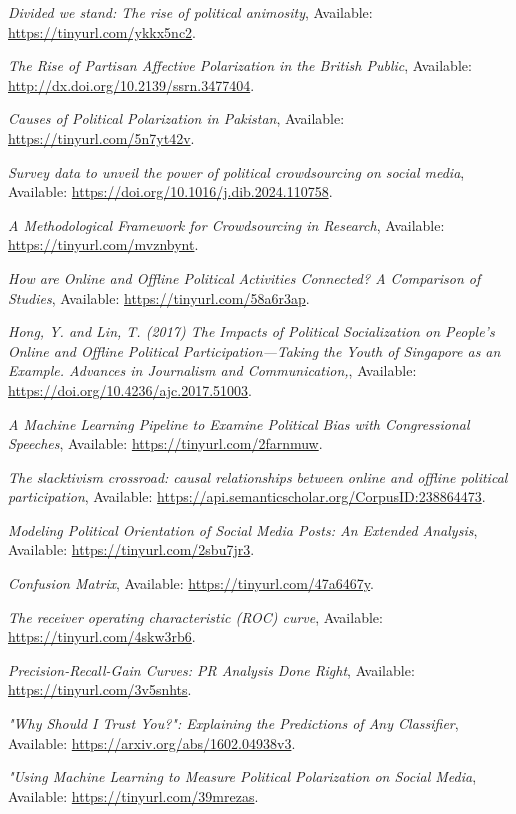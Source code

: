 \documentclass[pt]{article}  %
\begin{document}
\begin{thebibliography}{9}
\small {}\label{ref1}
\textit{Divided we stand: The rise of political animosity},
Available: \url{https://tinyurl.com/ykkx5nc2}.

\small {}\label{ref2}
\textit{The Rise of Partisan Affective Polarization in the British Public},
Available: \url{http://dx.doi.org/10.2139/ssrn.3477404}.

\small
{}\label{ref3}
\textit{Causes of Political Polarization in Pakistan},
Available: \url{https://tinyurl.com/5n7yt42v}. 

\label{ref4}
 \textit{Survey data to unveil the power of political crowdsourcing on social media},
Available: \url{https://doi.org/10.1016/j.dib.2024.110758}.

\label{ref5}
\textit{A Methodological Framework for Crowdsourcing in Research},
Available: \url{https://tinyurl.com/mvznbynt}.

\label{ref6}
\textit{How are Online and Offline Political Activities Connected?
A Comparison of Studies},
Available: \url{https://tinyurl.com/58a6r3ap}.

\label{ref7}
\textit{Hong, Y. and Lin, T. (2017) The Impacts of Political Socialization on People’s Online and Offline Political Participation—Taking the Youth of Singapore as an Example. Advances in Journalism and Communication,},
Available: \url{https://doi.org/10.4236/ajc.2017.51003}.

\label{ref8}
\textit{A Machine Learning Pipeline to Examine Political Bias with Congressional Speeches},
Available: \url{https://tinyurl.com/2farnmuw}.

\label{ref9}
\textit{The slacktivism crossroad: causal relationships between online and offline political participation},
Available: \url{https://api.semanticscholar.org/CorpusID:238864473}.

\label{ref10}
\textit{Modeling Political Orientation of Social Media Posts: An Extended Analysis},
Available: \url{https://tinyurl.com/2sbu7jr3}.

\label{ref11}
\textit{Confusion Matrix},
Available: \url{https://tinyurl.com/47a6467y}.

\label{ref12}
\textit{The receiver operating characteristic (ROC) curve},
Available: \url{https://tinyurl.com/4skw3rb6}.

\label{ref13}
\textit{Precision-Recall-Gain Curves:
PR Analysis Done Right},
Available: \url{https://tinyurl.com/3v5snhts}.

\label{ref14}
\textit{"Why Should I Trust You?": Explaining the Predictions of Any Classifier},
Available: \url{https://arxiv.org/abs/1602.04938v3}.

\label{ref15}
\textit{"Using Machine Learning to Measure Political Polarization on Social Media},
Available: \url{https://tinyurl.com/39mrezas}.

\end{thebibliography}
\end{document}
